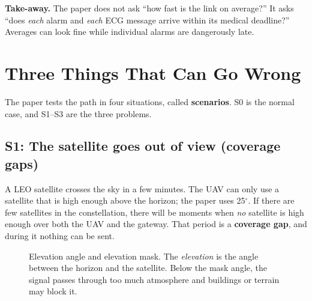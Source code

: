 \documentclass[11pt,a4paper]{article}
\newcommand{\kt}[1]{\textbf{\color{navy}#1}}
\newcommand{\insight}[1]{\begin{idea}\textsf{\textbf{\color{amber!80!black}Take-away.}} #1\end{idea}}
\begin{document}
\insight{The paper does not ask ``how fast is the link on average?'' It asks ``does \emph{each} alarm and \emph{each} ECG message arrive within its medical deadline?'' Averages can look fine while individual alarms are dangerously late.}

\section{Three Things That Can Go Wrong}

The paper tests the path in four situations, called \kt{scenarios}. S0 is the normal case, and S1--S3 are the three problems.

\subsection{S1: The satellite goes out of view (coverage gaps)}

A LEO satellite crosses the sky in a few minutes. The UAV can only use a satellite that is high enough above the horizon; the paper uses 25$^\circ$. If there are few satellites in the constellation, there will be moments when \emph{no} satellite is high enough over both the UAV and the gateway. That period is a \kt{coverage gap}, and during it nothing can be sent.

\begin{figure}[h]
\centering
{}
\caption{Elevation angle and elevation mask. The \emph{elevation} is the angle between the horizon and the satellite. Below the mask angle, the signal passes through too much atmosphere and buildings or terrain may block it.}\label{fig:mask}
\end{figure}
\end{document}
